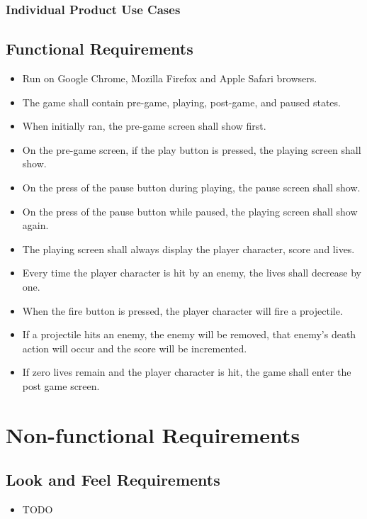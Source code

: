 \documentclass[12pt, titlepage]{article}
\begin{document}
\subsubsection{Individual Product Use Cases}

\subsection{Functional Requirements}
  \begin{itemize}
    \item Run on Google Chrome, Mozilla Firefox and Apple Safari browsers.
    \item The game shall contain pre-game, playing, post-game, and paused states.
    \item When initially ran, the pre-game screen shall show first.
    \item On the pre-game screen, if the play button is pressed, the playing screen shall show.
    \item On the press of the pause button during playing, the pause screen shall show.
    \item On the press of the pause button while paused, the playing screen shall show again.
    \item The playing screen shall always display the player character, score and lives.
    \item Every time the player character is hit by an enemy, the lives shall decrease by one.
    \item When the fire button is pressed, the player character will fire a projectile.
    \item If a projectile hits an enemy, the enemy will be removed, that enemy's death action will occur and the score will be incremented.
    \item If zero lives remain and the player character is hit, the game shall enter the post game screen.
    
  \end{itemize}

\section{Non-functional Requirements}

\subsection{Look and Feel Requirements}
  \begin{itemize}
    \item TODO
  \end{itemize}
\end{document}
